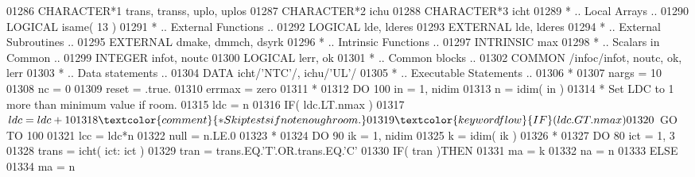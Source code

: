 \begin{DoxyCode}
01286       \textcolor{keywordtype}{CHARACTER*1}        trans, transs, uplo, uplos
01287       \textcolor{keywordtype}{CHARACTER*2}        ichu
01288       \textcolor{keywordtype}{CHARACTER*3}        icht
01289 \textcolor{comment}{*     .. Local Arrays ..}
01290       \textcolor{keywordtype}{LOGICAL}            isame( 13 )
01291 \textcolor{comment}{*     .. External Functions ..}
01292       \textcolor{keywordtype}{LOGICAL}            lde, lderes
01293       \textcolor{keywordtype}{EXTERNAL}           lde, lderes
01294 \textcolor{comment}{*     .. External Subroutines ..}
01295       \textcolor{keywordtype}{EXTERNAL}           dmake, dmmch, dsyrk
01296 \textcolor{comment}{*     .. Intrinsic Functions ..}
01297       \textcolor{keywordtype}{INTRINSIC}          max
01298 \textcolor{comment}{*     .. Scalars in Common ..}
01299       \textcolor{keywordtype}{INTEGER}            infot, noutc
01300       \textcolor{keywordtype}{LOGICAL}            lerr, ok
01301 \textcolor{comment}{*     .. Common blocks ..}
01302       \textcolor{keyword}{COMMON}             /infoc/infot, noutc, ok, lerr
01303 \textcolor{comment}{*     .. Data statements ..}
01304       \textcolor{keyword}{DATA}               icht/\textcolor{stringliteral}{'NTC'}/, ichu/\textcolor{stringliteral}{'UL'}/
01305 \textcolor{comment}{*     .. Executable Statements ..}
01306 \textcolor{comment}{*}
01307       nargs = 10
01308       nc = 0
01309       reset = .true.
01310       errmax = zero
01311 \textcolor{comment}{*}
01312       \textcolor{keywordflow}{DO} 100 in = 1, nidim
01313          n = idim( in )
01314 \textcolor{comment}{*        Set LDC to 1 more than minimum value if room.}
01315          ldc = n
01316          \textcolor{keywordflow}{IF}( ldc.LT.nmax )
01317      $      ldc = ldc + 1
01318 \textcolor{comment}{*        Skip tests if not enough room.}
01319          \textcolor{keywordflow}{IF}( ldc.GT.nmax )
01320      $      \textcolor{keywordflow}{GO TO} 100
01321          lcc = ldc*n
01322          null = n.LE.0
01323 \textcolor{comment}{*}
01324          \textcolor{keywordflow}{DO} 90 ik = 1, nidim
01325             k = idim( ik )
01326 \textcolor{comment}{*}
01327             \textcolor{keywordflow}{DO} 80 ict = 1, 3
01328                trans = icht( ict: ict )
01329                tran = trans.EQ.\textcolor{stringliteral}{'T'}.OR.trans.EQ.\textcolor{stringliteral}{'C'}
01330                \textcolor{keywordflow}{IF}( tran )\textcolor{keywordflow}{THEN}
01331                   ma = k
01332                   na = n
01333                \textcolor{keywordflow}{ELSE}
01334                   ma = n

\end{DoxyCode}
